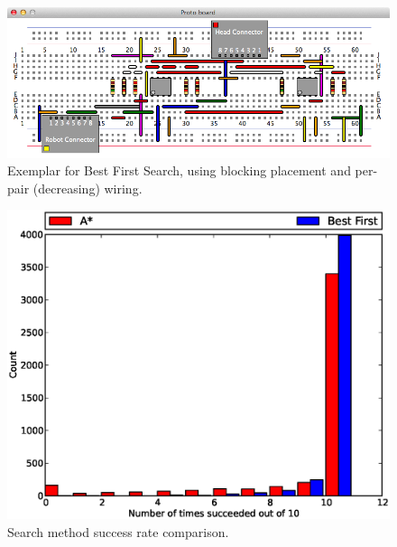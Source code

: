 \begin{figure}[H]
\begin{center}
\includegraphics[width=\textwidth]{Images/exemplar_best_first.png}
\caption[Best First Search exemplar]{Exemplar for Best First Search, using
blocking placement and per-pair (decreasing) wiring.}
\end{center}
\end{figure}

\begin{figure}[H]
\begin{center}
\includegraphics[width=\textwidth]{Images/search_success_comparison.eps}
\caption[Search method success rate comparison]{Search method success rate
comparison.}
\label{fig:search_success}
\end{center}
\end{figure}

